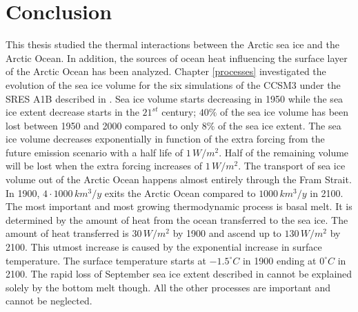 \section{Conclusion}

This thesis studied the thermal interactions between the Arctic sea ice and the Arctic Ocean. In addition, the sources of ocean heat influencing the surface layer of the Arctic Ocean has been analyzed. Chapter \ref{processes} investigated the evolution of the sea ice volume for the six simulations of the CCSM3 under the SRES A1B described in \cite{Holland2006fa}. Sea ice volume starts decreasing in 1950 while the sea ice extent decrease starts in the $21^{st}$ century; $40\%$ of the sea ice volume has been lost between 1950 and 2000 compared to only $8\%$ of the sea ice extent. The sea ice volume decreases exponentially in function of the extra forcing from the future emission scenario with a half life of $1\,W/m^2$. Half of the remaining volume will be lost when the extra forcing increases of $1\,W/m^2$. The transport of sea ice volume out of the Arctic Ocean happens almost entirely through the Fram Strait. In 1900, $4\cdot 1000\,km^3/y$ exits the Arctic Ocean compared to $1000\,km^3/y$ in 2100. The most important and most growing thermodynamic process is basal melt. It is determined by the amount of heat from the ocean transferred to the sea ice. The amount of heat transferred is $30\,W/m^2$ by 1900 and ascend up to $130\,W/m^2$ by 2100. This utmost increase is caused by the exponential increase in surface temperature. The surface temperature starts at $-1.5^\circ C$ in 1900 ending at $0^\circ C$ in 2100. The rapid loss of September sea ice extent described in \cite{Holland2006fa} cannot be explained solely by the bottom melt though. All the other processes are important and cannot be neglected. 

